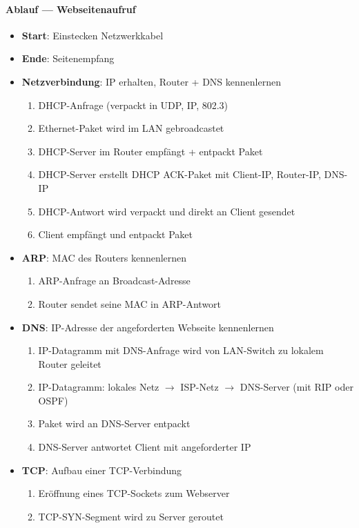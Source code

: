 \paragraph{Ablauf --- Webseitenaufruf}
\begin{itemize}
  \item \textbf{Start}: Einstecken Netzwerkkabel
  \item \textbf{Ende}: Seitenempfang
  \item \textbf{Netzverbindung}: IP erhalten, Router + DNS kennenlernen
  \begin{enumerate}
    \item DHCP-Anfrage (verpackt in UDP, IP, 802.3)
    \item Ethernet-Paket wird im LAN gebroadcastet
    \item DHCP-Server im Router empfängt + entpackt Paket
    \item DHCP-Server erstellt DHCP ACK-Paket mit Client-IP, Router-IP, DNS-IP
    \item DHCP-Antwort wird verpackt und direkt an Client gesendet
    \item Client empfängt und entpackt Paket
  \end{enumerate}
  \item \textbf{ARP}: MAC des Routers kennenlernen
  \begin{enumerate}
    \item ARP-Anfrage an Broadcast-Adresse
    \item Router sendet seine MAC in ARP-Antwort
  \end{enumerate}
  \item \textbf{DNS}: IP-Adresse der angeforderten Webseite kennenlernen
  \begin{enumerate}
    \item IP-Datagramm mit DNS-Anfrage wird von LAN-Switch zu lokalem Router geleitet
    \item IP-Datagramm: lokales Netz \( \to \) ISP-Netz \( \to \) DNS-Server (mit RIP oder OSPF)
    \item Paket wird an DNS-Server entpackt
    \item DNS-Server antwortet Client mit angeforderter IP
  \end{enumerate}
  \item \textbf{TCP}: Aufbau einer TCP-Verbindung
  \begin{enumerate}
    \item Eröffnung eines TCP-Sockets zum Webserver
    \item TCP-SYN-Segment wird zu Server geroutet

\end{enumerate}
\end{itemize}
